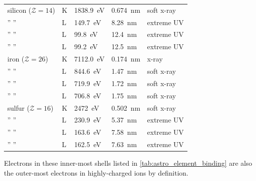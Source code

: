 \begin{table}[]
\begin{tabular}{@{}lllll@{}}
 silicon ($\mathcal{Z}=14$) & K & \SI{1838.9}{\electronvolt} & \SI{0.674}{\nano\metre} & soft x-ray \\
 \hspace{5mm}'' \hspace{12mm}'' & L & \SI{149.7}{\electronvolt} & \SI{8.28}{\nano\metre} & extreme UV \\ 
 \hspace{5mm}'' \hspace{12mm}'' & L & \SI{99.8}{\electronvolt} & \SI{12.4}{\nano\metre} & extreme UV \\
 \hspace{5mm}'' \hspace{12mm}'' & L & \SI{99.2}{\electronvolt} & \SI{12.5}{\nano\metre} & extreme UV \\ \midrule
 iron ($\mathcal{Z}=26$) & K & \SI{7112.0}{\electronvolt} & \SI{0.174}{\nano\metre} & x-ray \\ 
 \hspace{3mm}'' \hspace{10mm}'' & L & \SI{844.6}{\electronvolt} & \SI{1.47}{\nano\metre} & soft x-ray \\
 \hspace{3mm}'' \hspace{10mm}'' & L & \SI{719.9}{\electronvolt} & \SI{1.72}{\nano\metre} & soft x-ray \\
 \hspace{3mm}'' \hspace{10mm}'' & L & \SI{706.8}{\electronvolt} & \SI{1.75}{\nano\metre} & soft x-ray \\ \midrule
 sulfur ($\mathcal{Z}=16$) & K & \SI{2472}{\electronvolt} & \SI{0.502}{\nano\metre} & soft x-ray \\
 \hspace{5mm}'' \hspace{11mm}'' & L & \SI{230.9}{\electronvolt} & \SI{5.37}{\nano\metre} & extreme UV \\
 \hspace{5mm}'' \hspace{11mm}'' & L & \SI{163.6}{\electronvolt} & \SI{7.58}{\nano\metre} & extreme UV \\
 \hspace{5mm}'' \hspace{11mm}'' & L & \SI{162.5}{\electronvolt} & \SI{7.63}{\nano\metre} & extreme UV \\
 \bottomrule
 \end{tabular}
 \end{table}
Electrons in these inner-most shells listed in \cref{tab:astro_element_binding} are also the outer-most electrons in highly-charged ions by definition. 
